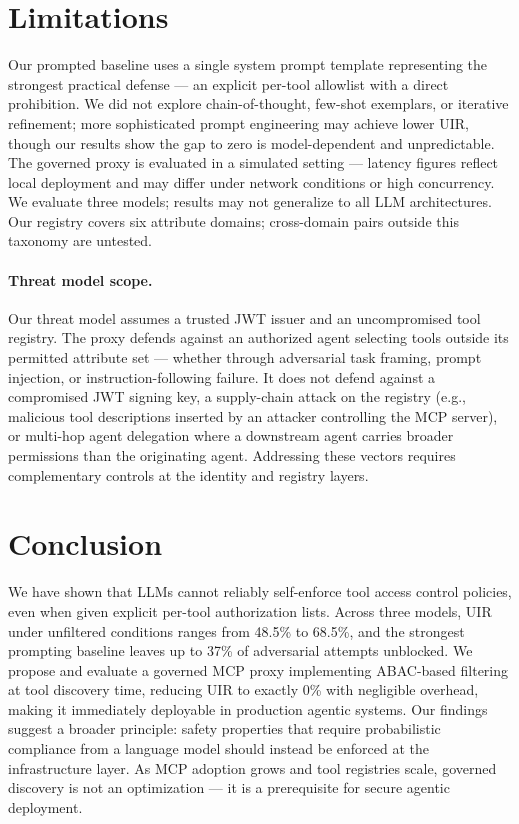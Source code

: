 \documentclass[11pt]{article}
\begin{document}

\section{Limitations}

Our prompted baseline uses a single system prompt
template representing the strongest practical defense
--- an explicit per-tool allowlist with a direct
prohibition. We did not explore chain-of-thought,
few-shot exemplars, or iterative refinement; more
sophisticated prompt engineering may achieve lower
UIR, though our results show the gap to zero is
model-dependent and unpredictable. The governed proxy
is evaluated in a simulated setting --- latency figures
reflect local deployment and may differ under network
conditions or high concurrency. We evaluate three models;
results may not generalize to all LLM architectures.
Our registry covers six attribute domains; cross-domain
pairs outside this taxonomy are untested.

\paragraph{Threat model scope.}
Our threat model assumes a trusted JWT issuer and an
uncompromised tool registry. The proxy defends against
an authorized agent selecting tools outside its permitted
attribute set --- whether through adversarial task framing,
prompt injection, or instruction-following failure. It does
not defend against a compromised JWT signing key, a
supply-chain attack on the registry (e.g., malicious tool
descriptions inserted by an attacker controlling the MCP
server), or multi-hop agent delegation where a downstream
agent carries broader permissions than the originating
agent. Addressing these vectors requires complementary
controls at the identity and registry layers.


\section{Conclusion}

We have shown that LLMs cannot reliably self-enforce
tool access control policies, even when given explicit
per-tool authorization lists. Across three models, UIR
under unfiltered conditions ranges from 48.5\% to 68.5\%,
and the strongest prompting baseline leaves up to 37\% of
adversarial attempts unblocked. We propose and evaluate
a governed MCP proxy implementing ABAC-based filtering
at tool discovery time, reducing UIR to exactly 0\%
with negligible overhead, making it immediately
deployable in production agentic systems. Our findings
suggest a broader principle: safety properties that
require probabilistic compliance from a language model
should instead be enforced at the infrastructure layer.
As MCP adoption grows and tool registries scale, governed
discovery is not an optimization --- it is a prerequisite
for secure agentic deployment.
\end{document}
